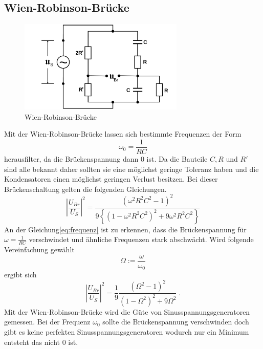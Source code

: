 \subsection{Wien-Robinson-Brücke}
\begin{figure}
  \centering
  \includegraphics[width=0.7\textwidth]{Bilder/Wien_Robinsonbruecke.png}
  \caption{Wien-Robinson-Brücke}
  \label{fig:WBBruecke}
\end{figure}
Mit der Wien-Robinson-Brücke lassen sich bestimmte Frequenzen der Form
\begin{equation}
\omega_0=\frac{1}{RC}
\end{equation}
herausfilter, da die Brückenspannung dann $0$ ist. Da die Bauteile $C,R$ und $R'$
sind alle bekannt daher sollten sie eine möglichst geringe Toleranz haben und
die Kondensatoren einen möglichst geringen Verlust besitzen. Bei dieser
Brückenschaltung gelten die folgenden Gleichungen.
\begin{equation}
\left|\frac{U_{Br}}{U_S}\right|^2=\frac{(\omega^2R^2C^2-1)^2}
{9\left\{(1-\omega^2 R^2 C^2)^2+9\omega^2R^2C^2\right\}}
\label{eq:frequenz}
\end{equation}
An der Gleichung\eqref{eq:frequenz} ist zu erkennen, dass die Brückenspannung
für $\omega=\frac{1}{RC}$ verschwindet und ähnliche Frequenzen stark abschwächt.
Wird folgende Vereinfachung gewählt
\begin{equation}
\Omega:=\frac{\omega}{\omega_0}
\end{equation}
ergibt sich
\begin{equation}
\left|\frac{U_{Br}}{U_S}\right|^2=\frac{1}{9}\frac{(\Omega^2-1)^2}
{(1-\Omega^2)^2+9\Omega^2}  \; .
\end{equation}
Mit der Wien-Robinson-Brücke wird die Güte von Sinusspannungsgeneratoren gemessen.
Bei der Frequenz $\omega_0$ sollte die Brückenspannung verschwinden doch gibt es
keine perfekten Sinusspannungsgeneratoren wodurch nur ein Minimum entsteht das nicht
$0$ ist.
